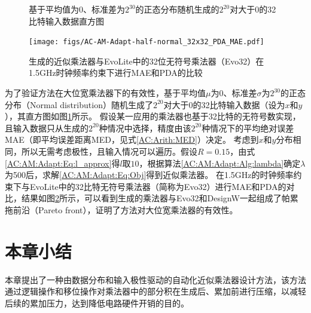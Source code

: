 \begin{figure}[!htb]
    \centering
\caption{基于平均值为0、标准差为$2^{30}$的正态分布随机生成的$2^{20}$对大于0的32比特输入数据直方图}
\label{AC:AM:Adapt:Fig:half-normal_histograms}
\end{figure}

\begin{figure}[!h]
    \centering
    \texttt{[image: figs/AC-AM-Adapt-half-normal\_32x32\_PDA\_MAE.pdf]}
    \caption{生成的近似乘法器与EvoLite中的32位无符号乘法器（Evo32）在1.5GHz时钟频率约束下进行MAE和PDA的比较}
    \label{AC:AM:Adapt:Fig:half-norm_32x32_PDA_MAE}
\end{figure}

为了验证方法在大位宽乘法器下的有效性，基于平均值$\mu$为0、标准差$\sigma$为$2^{30}$的正态分布（Normal distribution）随机生成了$2^{20}$对大于0的32比特输入数据（设为$x$和$y$），其直方图如图\ref{AC:AM:Adapt:Fig:half-normal_histograms}所示。
假设某一应用的乘法器也基于32比特的无符号数实现，且输入数据只从生成的$2^{20}$种情况中选择，精度由该$2^{20}$种情况下的平均绝对误差MAE（即平均误差距离MED，见式\eqref{AC:Arith:MED}）决定。
考虑到$x$和$y$分布相同，所以无需考虑极性，且输入情况可以遍历。假设$R=0.15$，由式\eqref{AC:AM:Adapt:Eq:l_approx}得$l$取$10$，根据算法\ref{AC:AM:Adapt:Alg:lambda}确定$\lambda$为500后，求解\eqref{AC:AM:Adapt:Eq:Obj}得到近似乘法器。
在1.5GHz的时钟频率约束下与EvoLite\cite{AC:AM:CGP_EvoLite}中的32比特无符号乘法器（简称为Evo32）进行MAE和PDA的对比，结果如图\ref{AC:AM:Adapt:Fig:half-norm_32x32_PDA_MAE}所示，可以看到生成的乘法器与Evo32和DesignW一起组成了帕累拖前沿（Pareto front），证明了方法对大位宽乘法器的有效性。

\section{本章小结}


本章提出了一种由数据分布和输入极性驱动的自动化近似乘法器设计方法，该方法通过逻辑操作和移位操作对乘法器中的部分积在生成后、累加前进行压缩，以减轻后续的累加压力，达到降低电路硬件开销的目的。

